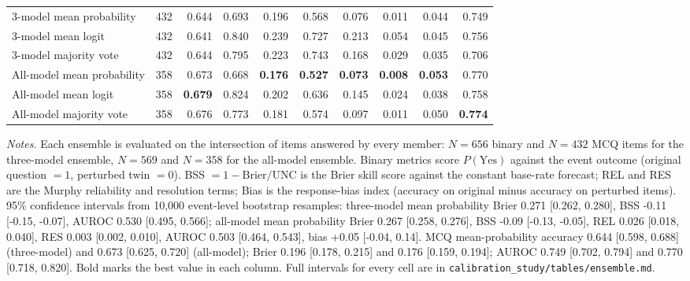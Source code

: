 \begin{table}[t]
\begin{tabular}{l r rrrrrrrr}
\midrule
3-model mean probability & 432 & 0.644 & 0.693 & 0.196 & 0.568 & 0.076 & 0.011 & 0.044 & 0.749 \\
3-model mean logit & 432 & 0.641 & 0.840 & 0.239 & 0.727 & 0.213 & 0.054 & 0.045 & 0.756 \\
3-model majority vote & 432 & 0.644 & 0.795 & 0.223 & 0.743 & 0.168 & 0.029 & 0.035 & 0.706 \\
All-model mean probability & 358 & 0.673 & 0.668 & \textbf{0.176} & \textbf{0.527} & \textbf{0.073} & \textbf{0.008} & \textbf{0.053} & 0.770 \\
All-model mean logit & 358 & \textbf{0.679} & 0.824 & 0.202 & 0.636 & 0.145 & 0.024 & 0.038 & 0.758 \\
All-model majority vote & 358 & 0.676 & 0.773 & 0.181 & 0.574 & 0.097 & 0.011 & 0.050 & \textbf{0.774} \\
\bottomrule
\end{tabular}
\begin{flushleft}\footnotesize\textit{Notes.} Each ensemble is evaluated on the intersection of items answered by every member: $N=656$ binary and $N=432$ MCQ items for the three-model ensemble, $N=569$ and $N=358$ for the all-model ensemble. Binary metrics score $P(\mathrm{Yes})$ against the event outcome (original question $=1$, perturbed twin $=0$). BSS $=1-\mathrm{Brier}/\mathrm{UNC}$ is the Brier skill score against the constant base-rate forecast; REL and RES are the Murphy reliability and resolution terms; Bias is the response-bias index (accuracy on original minus accuracy on perturbed items). 95\% confidence intervals from 10,000 event-level bootstrap resamples: three-model mean probability Brier 0.271 [0.262, 0.280], BSS -0.11 [-0.15, -0.07], AUROC 0.530 [0.495, 0.566]; all-model mean probability Brier 0.267 [0.258, 0.276], BSS -0.09 [-0.13, -0.05], REL 0.026 [0.018, 0.040], RES 0.003 [0.002, 0.010], AUROC 0.503 [0.464, 0.543], bias +0.05 [-0.04, 0.14]. MCQ mean-probability accuracy 0.644 [0.598, 0.688] (three-model) and 0.673 [0.625, 0.720] (all-model); Brier 0.196 [0.178, 0.215] and 0.176 [0.159, 0.194]; AUROC 0.749 [0.702, 0.794] and 0.770 [0.718, 0.820]. Bold marks the best value in each column. Full intervals for every cell are in \texttt{calibration\_study/tables/ensemble.md}.
\end{flushleft}
\end{table}
